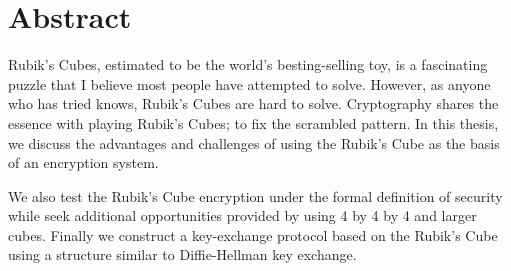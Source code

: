 \chapter{Abstract}\label{chap:abstract}
\par Rubik's Cubes, estimated to be the world's besting-selling toy, is a fascinating puzzle that I believe most people have attempted to solve. However, as anyone who has tried knows, Rubik's Cubes are hard to solve. Cryptography shares the essence with playing Rubik's Cubes; to fix the scrambled pattern. In this thesis, we discuss the advantages and challenges of using the Rubik's Cube as the basis of an encryption system. 
\par We also test the Rubik's Cube encryption under the formal definition of security while seek additional opportunities provided by using 4 by 4 by 4 and larger cubes. Finally we construct a key-exchange protocol based on the Rubik's Cube using a structure similar to Diffie-Hellman key exchange.